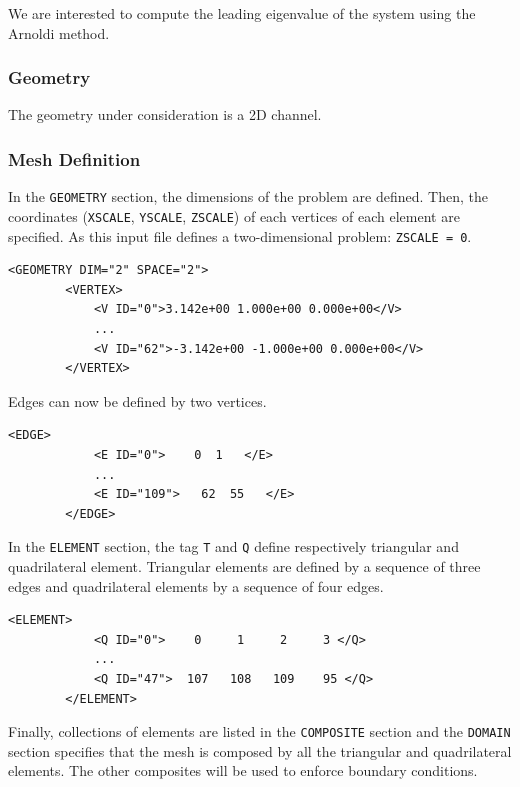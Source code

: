   We are interested to compute the leading eigenvalue of the system using the Arnoldi method.
  
  \subsubsection{Geometry}
  
   The geometry under consideration is a 2D channel. 
   
   \subsubsection{Mesh Definition}
   
   In the \texttt{GEOMETRY} section, the dimensions of the problem are defined. Then, the coordinates (\texttt{XSCALE}, \texttt{YSCALE}, \texttt{ZSCALE}) of each vertices of each element are specified. As this input file defines a two-dimensional problem: \texttt{ZSCALE = 0}. 
   
  \begin{lstlisting}[style=XMLStyle]
<GEOMETRY DIM="2" SPACE="2">
        <VERTEX>
            <V ID="0">3.142e+00 1.000e+00 0.000e+00</V>
            ...
            <V ID="62">-3.142e+00 -1.000e+00 0.000e+00</V>
        </VERTEX>
\end{lstlisting}

Edges can now be defined by two vertices.

  \begin{lstlisting}[style=XMLStyle]
<EDGE>
            <E ID="0">    0  1   </E>
            ...
            <E ID="109">   62  55   </E>
        </EDGE>
\end{lstlisting}


In the \texttt{ELEMENT} section, the tag \texttt{T} and \texttt{Q} define respectively triangular and quadrilateral element. Triangular elements are defined by a sequence of three edges and quadrilateral elements by a sequence of four edges.

  \begin{lstlisting}[style=XMLStyle]
        <ELEMENT>
            <Q ID="0">    0     1     2     3 </Q>
            ...
            <Q ID="47">  107   108   109    95 </Q>
        </ELEMENT>
        \end{lstlisting}

Finally, collections of elements are listed in the \texttt{COMPOSITE} section and the \texttt{DOMAIN} section specifies that the mesh is composed by all the triangular and quadrilateral elements. The other composites will be used to enforce boundary conditions. 

